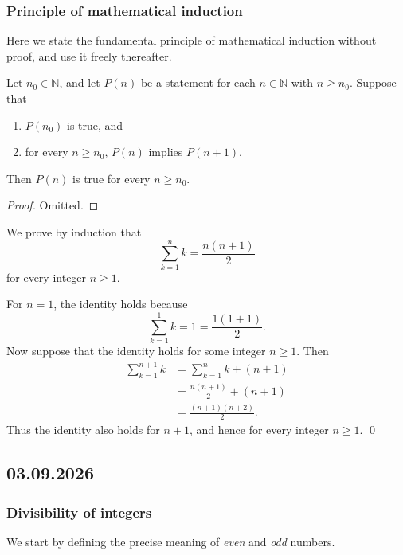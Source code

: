 \documentclass[11pt,a4paper]{amsart}
\begin{document}
\subsubsection{Principle of mathematical induction}

Here we state the fundamental principle of mathematical induction without proof,
and use it freely thereafter.

\begin{theorem}\label{thm:induction}
  Let \(n_0 \in \mathbb{N}\), and let \(P(n)\) be a statement for each
  \(n \in \mathbb{N}\) with \(n \geq n_0\). Suppose that
  \begin{enumerate}
    \item \(P(n_0)\) is true, and
    \item for every \(n \geq n_0\), \(P(n)\) implies \(P(n+1)\).
  \end{enumerate}
  Then \(P(n)\) is true for every \(n \geq n_0\).
\end{theorem}

\begin{proof}
  Omitted.
\end{proof}

\begin{example}
  We prove by induction that
  \[
    \sum_{k=1}^{n} k = \frac{n(n+1)}{2}
  \]
  for every integer \(n \geq 1\).

  For \(n=1\), the identity holds because
  \[
    \sum_{k=1}^{1} k = 1 = \frac{1(1+1)}{2}.
  \]
  Now suppose that the identity holds for some integer \(n \geq 1\). Then
  \begin{align*}
    \sum_{k=1}^{n+1} k
    &= \sum_{k=1}^{n} k + (n+1) \\
    &= \frac{n(n+1)}{2} + (n+1) \\
    &= \frac{(n+1)(n+2)}{2}.
  \end{align*}
  Thus the identity also holds for \(n+1\), and hence for every integer
  \(n \geq 1\). \qed
\end{example}

\subsection{03.09.2026}

\subsubsection{Divisibility of integers}

We start by defining the precise meaning of \emph{even} and \emph{odd} numbers.
\end{document}
